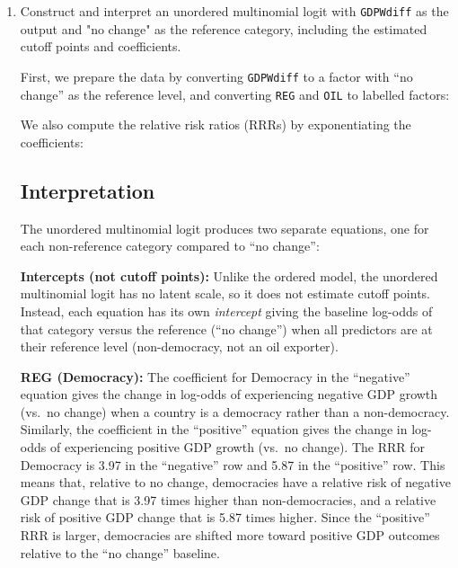 \documentclass[12pt,letterpaper]{article}
\begin{document}
\begin{enumerate}
	\item Construct and interpret an unordered multinomial logit with \texttt{GDPWdiff} as the output and "no change" as the reference category, including the estimated cutoff points and coefficients.

\vspace{.25cm}

First, we prepare the data by converting \texttt{GDPWdiff} to a factor with ``no change'' as the reference level, and converting \texttt{REG} and \texttt{OIL} to labelled factors:


\vspace{.5cm}



\vspace{.5cm}
We also compute the relative risk ratios (RRRs) by exponentiating the coefficients:



\subsection*{Interpretation}

The unordered multinomial logit produces two separate equations, one for each non-reference category compared to ``no change'':

\textbf{Intercepts (not cutoff points):} Unlike the ordered model, the unordered multinomial logit has no latent scale, so it does not estimate cutoff points. Instead, each equation has its own \textit{intercept} giving the baseline log-odds of that category versus the reference (``no change'') when all predictors are at their reference level (non-democracy, not an oil exporter).

\textbf{REG (Democracy):} The coefficient for Democracy in the ``negative'' equation gives the change in log-odds of experiencing negative GDP growth (vs.\ no change) when a country is a democracy rather than a non-democracy. Similarly, the coefficient in the ``positive'' equation gives the change in log-odds of experiencing positive GDP growth (vs.\ no change). The RRR for Democracy is 3.97 in the ``negative'' row and 5.87 in the ``positive'' row. This means that, relative to no change, democracies have a relative risk of negative GDP change that is 3.97 times higher than non-democracies, and a relative risk of positive GDP change that is 5.87 times higher. Since the ``positive'' RRR is larger, democracies are shifted more toward positive GDP outcomes relative to the ``no change'' baseline.


\end{enumerate}
\end{document}
